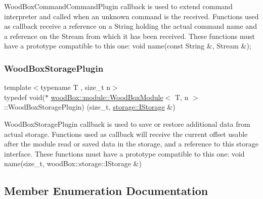 Wood\+Box\+Command\+Command\+Plugin callback is used to extend command interpreter and called when an unknown command is the received. Functions used as callback receive a reference on a String holding the actual command name and a reference on the Stream from which it has been received. These functions must have a prototype compatible to this one\+: void name(const String \&, Stream \&); \mbox{\label{classwood_box_1_1module_1_1_wood_box_module_ac7fea0a06e9fcab2ffb63500f6cd6565}} 
\subsubsection{\texorpdfstring{Wood\+Box\+Storage\+Plugin}{WoodBoxStoragePlugin}}
{\footnotesize\ttfamily template$<$typename T , size\+\_\+t n$>$ \\
typedef void($\ast$ \mbox{\hyperlink{classwood_box_1_1module_1_1_wood_box_module}{wood\+Box\+::module\+::\+Wood\+Box\+Module}}$<$ T, n $>$\+::Wood\+Box\+Storage\+Plugin) (size\+\_\+t, \mbox{\hyperlink{classwood_box_1_1storage_1_1_i_storage}{storage\+::\+I\+Storage}} \&)}

Wood\+Box\+Storage\+Plugin callback is used to save or restore additional data from actual storage. Functions used as callback will receive the current offset usable after the module read or saved data in the storage, and a reference to this storage interface. These functions must have a prototype compatible to this one\+: void name(size\+\_\+t, wood\+Box\+::storage\+::\+I\+Storage \&) 

\subsection{Member Enumeration Documentation}
\mbox{\label{classwood_box_1_1module_1_1_wood_box_module_af74476c8a785de7fe587c4fb68435673}} 

